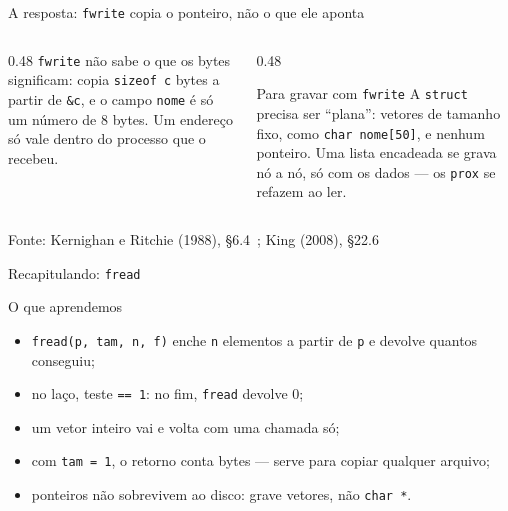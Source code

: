 \documentclass[aspectratio=169]{beamer}
\newcommand{\fileira}[4]{%
  \foreach \c [count=\k from 0] in {#4} {
    \node[#3] at (#1+0.36*\k, #2) {\c};
  }
}
\newcommand{\fonte}[1]{\vfill\hfill{\scriptsize\textcolor{UFSGray}{Fonte: #1}}}
\begin{document}
\begin{frame}{A resposta: \texttt{fwrite} copia o ponteiro, não o que ele aponta}
  \begin{center}
  \end{center}
  \vspace{-0.3em}
  \begin{columns}[T]
    \begin{column}{0.48\textwidth}
      \small \texttt{fwrite} não sabe o que os bytes significam: copia
      \texttt{sizeof c} bytes a partir de \texttt{\&c}, e o campo
      \texttt{nome} é só um número de 8 bytes. Um endereço só vale dentro do
      processo que o recebeu.
    \end{column}
    \begin{column}{0.48\textwidth}
      \begin{block}{Para gravar com \texttt{fwrite}}
        \small A \texttt{struct} precisa ser ``plana'': vetores de tamanho
        fixo, como \texttt{char nome[50]}, e nenhum ponteiro. Uma lista
        encadeada se grava nó a nó, só com os dados --- os
        \texttt{prox} se refazem ao ler.
      \end{block}
    \end{column}
  \end{columns}
  \fonte{Kernighan e Ritchie (1988), §6.4~\cite{kernighan1988c};
    King (2008), §22.6~\cite{king2008c}}
\end{frame}

\begin{frame}{Recapitulando: \texttt{fread}}
  \begin{block}{O que aprendemos}
    \begin{itemize}
      \item \texttt{fread(p, tam, n, f)} enche \texttt{n} elementos a
        partir de \texttt{p} e devolve quantos conseguiu;
      \item no laço, teste \texttt{== 1}: no fim, \texttt{fread} devolve 0;
      \item um vetor inteiro vai e volta com uma chamada só;
      \item com \texttt{tam = 1}, o retorno conta bytes --- serve para
        copiar qualquer arquivo;
      \item ponteiros não sobrevivem ao disco: grave vetores, não
        \texttt{char *}.
    \end{itemize}
  \end{block}
\end{frame}
\end{document}
